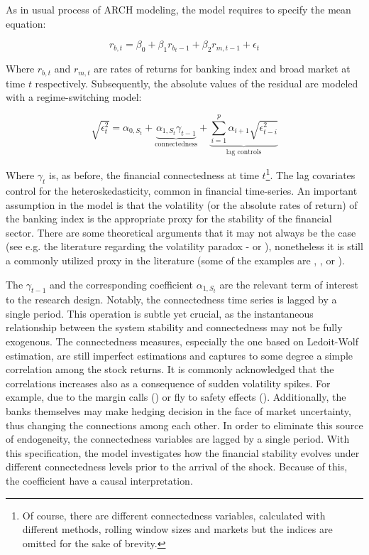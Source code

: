 \documentclass[12pt]{article}
\begin{document}
As in usual process of ARCH modeling, the model requires to specify the mean equation:

\begin{equation}
	r_{b,t} = \beta_0 + \beta_1 r_{b_t-1} + \beta_2 r_{m, t-1} + \epsilon_t	
\end{equation}

Where $r_{b,t}$ and $r_{m, t}$ are rates of returns for banking index and broad market at time $t$ respectively. Subsequently, the absolute values of the residual are modeled with a regime-switching model:

\begin{equation}
	\sqrt{\epsilon^{2}_t} = \alpha_{0,S_t} + \underbrace{\alpha_{1,S_t} \gamma_{t-1}}_{\text{connectedness}} + \underbrace{\sum_{i=1}^{p} \alpha_{i+1} \sqrt{\epsilon^2_{t-i}}}_{\text{lag controls}}
\end{equation}

Where $\gamma_t$ is, as before, the financial connectedness at time $t$\footnote{Of course, there are different connectedness variables, calculated with different methods, rolling window sizes and markets but the indices are omitted for the sake of brevity.}. The lag covariates control for the heteroskedasticity, common in financial time-series. An important assumption in the model is that the volatility (or the absolute rates of return) of the banking index is the appropriate proxy for the stability of the financial sector. There are some theoretical arguments that it may not always be the case (see e.g. the literature regarding the volatility paradox - \citet{brunnermeier14} or \citet{danielsson18}), nonetheless it is still a commonly utilized proxy in the literature (some of the examples are \citet{nelson07}, \citet{bratis20}, \citet{imf08} or \citet{billio16}).

The $\gamma_{t-1}$ and the corresponding coefficient $\alpha_{1, S_t}$ are the relevant term of interest to the research design. Notably, the connectedness time series is lagged by a single period. This operation is subtle yet crucial, as the instantaneous relationship between the system stability and connectedness may not be fully exogenous. The connectedness measures, especially the one based on Ledoit-Wolf estimation, are still imperfect estimations and captures to some degree a simple correlation among the stock returns. It is commonly acknowledged that the correlations increases also as a consequence of sudden volatility spikes. For example, due to the margin calls (\citet{kahraman19}) or fly to safety effects (\citet{baele19}). Additionally, the banks themselves may make hedging decision in the face of market uncertainty, thus changing the connections among each other. In order to eliminate this source of endogeneity, the connectedness variables are lagged by a single period. With this specification, the model investigates how the financial stability evolves under different connectedness levels prior to the arrival of the shock. Because of this, the coefficient have a causal interpretation. 
\end{document}

